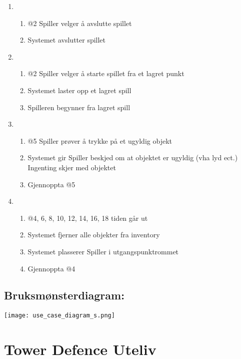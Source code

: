 \documentclass[12pt]{report}
\begin{document}
\begin{enumerate}[label=\Alph*]
\item 
\bigskip

\begin{enumerate}
\item @2 Spiller velger {\aa} avslutte spillet
\item Systemet avslutter spillet
\end{enumerate}
\item 
\bigskip

\begin{enumerate}
\item @2 Spiller velger {\aa} starte spillet fra et lagret punkt
\item Systemet laster opp et lagret spill
\item Spilleren begynner fra lagret spill
\end{enumerate}
\item 
\bigskip

\begin{enumerate}
\item @5 Spiller pr{\o}ver {\aa} trykke p{\aa} et ugyldig objekt
\item Systemet gir Spiller beskjed om at objektet er ugyldig (vha lyd ect.) Ingenting skjer med objektet
\item Gjennoppta @5
\end{enumerate}
\item 
\bigskip

\begin{enumerate}
\item @4, 6, 8, 10, 12, 14, 16, 18 tiden g{\aa}r ut
\item Systemet fjerner alle objekter fra inventory
\item Systemet plasserer Spiller i utgangspunktrommet
\item Gjennoppta @4
\end{enumerate}
\end{enumerate}

\subsection*{Bruksm{\o}nsterdiagram:}

\texttt{[image: use\_case\_diagram\_s.png]}



\section*{Tower Defence Uteliv}
\end{document}
